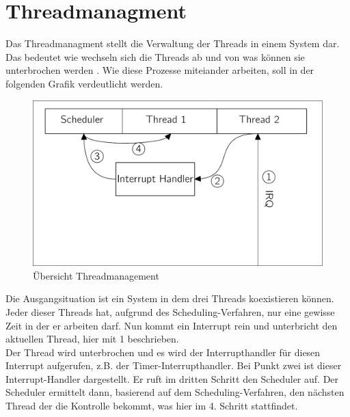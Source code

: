 \section{Threadmanagment}
Das Threadmanagment stellt die Verwaltung der Threads in einem System dar. Das bedeutet wie wechseln sich die Threads ab und von was k\"onnen sie unterbrochen werden . Wie diese Prozesse miteiander arbeiten, soll in der folgenden Grafik verdeutlicht werden.
\begin{figure}[H]
	\begin{center}	
	\caption{\"Ubersicht Threadmanagement}
	\includegraphics[scale=0.60]{common/draftconcrete-thread-managment.pdf}
	\end{center}
\end{figure}\noindent
Die Ausgangsituation ist ein System in dem drei Threads koexistieren k\"onnen. Jeder dieser Threads hat, aufgrund des Scheduling-Verfahren, nur eine gewisse Zeit in der er arbeiten darf. Nun kommt ein Interrupt rein und unterbricht den aktuellen Thread, hier mit 1 beschrieben. \\
Der Thread wird unterbrochen und es wird der Interrupthandler f\"ur diesen Interrupt aufgerufen, z.B. der Timer-Interrupthandler. Bei Punkt zwei ist dieser Interrupt-Handler dargestellt. Er ruft im dritten Schritt den Scheduler auf. Der Scheduler ermittelt dann, basierend auf dem Scheduling-Verfahren, den n\"achsten Thread der die Kontrolle bekommt, was hier im 4. Schritt stattfindet. 
